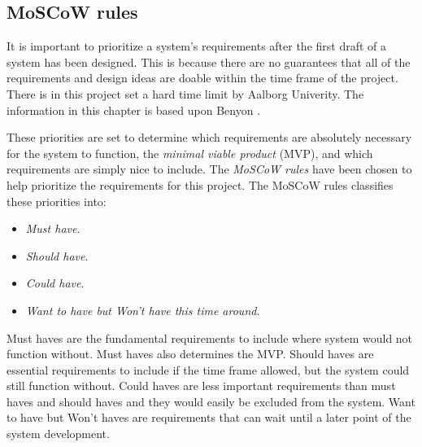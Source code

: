 \subsection{MoSCoW rules}\label{sec:requirements}
It is important to prioritize a system's requirements after the first draft of a system has been designed.
This is because there are no guarantees that all of the requirements and design ideas are doable within the time frame of the project.
There is in this project set a hard time limit by Aalborg Univerity.
The information in this chapter is based upon Benyon \cite{Benyon}.

These priorities are set to determine which requirements are absolutely necessary for the system to function, the \textit{minimal viable product} (MVP),
and which requirements are simply nice to include.
The \textit{MoSCoW rules}
have been chosen to help prioritize the requirements for this project.
The MoSCoW rules classifies these priorities into:

\begin{itemize}
    \item \textit{Must have}.
    \item \textit{Should have}.
    \item \textit{Could have}.
    \item \textit{Want to have but Won’t have this time around}.
\end{itemize}

Must haves are the fundamental requirements to include where system would not function without.
Must haves also determines the MVP.
Should haves are essential requirements to include if the time frame allowed, but the system could still function without.
Could haves are less important requirements than must haves and should haves and they would easily be excluded from the system.
Want to have but Won't haves are requirements that can wait until a later point of the system development.

